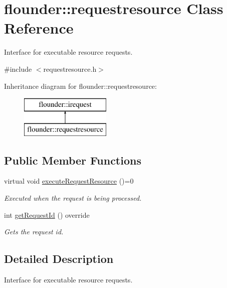 \hypertarget{classflounder_1_1requestresource}{}\section{flounder\+:\+:requestresource Class Reference}
\label{classflounder_1_1requestresource}


Interface for executable resource requests.  




{\ttfamily \#include $<$requestresource.\+h$>$}

Inheritance diagram for flounder\+:\+:requestresource\+:\begin{figure}[H]
\begin{center}
\leavevmode
\includegraphics[height=2.000000cm]{classflounder_1_1requestresource}
\end{center}
\end{figure}
\subsection*{Public Member Functions}
\begin{DoxyCompactItemize}
\item 
virtual void \hyperlink{classflounder_1_1requestresource_a041468425259aa834e7b969ae3f75d5a}{execute\+Request\+Resource} ()=0
\begin{DoxyCompactList}\small\item\em Executed when the request is being processed. \end{DoxyCompactList}\item 
int \hyperlink{classflounder_1_1requestresource_a4c46533325ddc35a1b89e4af418ea77e}{get\+Request\+Id} () override
\begin{DoxyCompactList}\small\item\em Gets the request id. \end{DoxyCompactList}\end{DoxyCompactItemize}


\subsection{Detailed Description}
Interface for executable resource requests. 



